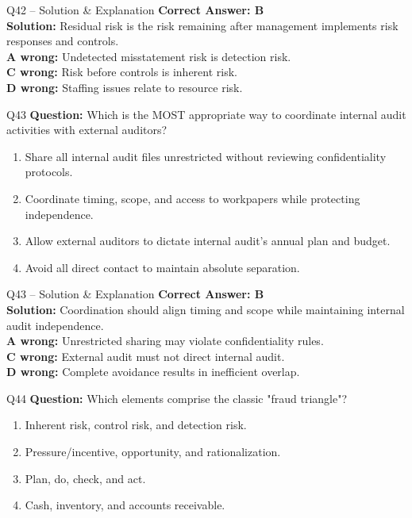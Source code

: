 \documentclass[aspectratio=169,10pt]{beamer}
\begin{document}
	\begin{frame}[t]{Q42 -- Solution \& Explanation}
		\small
		\textbf{Correct Answer: B} \\[4pt]
		\textbf{Solution:} Residual risk is the risk remaining after management implements risk responses and controls. \\[4pt]
		\textbf{A wrong:} Undetected misstatement risk is detection risk. \\[2pt]
		\textbf{C wrong:} Risk before controls is inherent risk. \\[2pt]
		\textbf{D wrong:} Staffing issues relate to resource risk.
	\end{frame}
	
	\begin{frame}[t]{Q43}
		\small
		\textbf{Question:} Which is the MOST appropriate way to coordinate internal audit activities with external auditors?
		\begin{enumerate}[label=\Alph*.,itemsep=1pt,topsep=2pt]
			\item Share all internal audit files unrestricted without reviewing confidentiality protocols.
			\item Coordinate timing, scope, and access to workpapers while protecting independence.
			\item Allow external auditors to dictate internal audit's annual plan and budget.
			\item Avoid all direct contact to maintain absolute separation.
		\end{enumerate}
	\end{frame}
	
	\begin{frame}[t]{Q43 -- Solution \& Explanation}
		\small
		\textbf{Correct Answer: B} \\[4pt]
		\textbf{Solution:} Coordination should align timing and scope while maintaining internal audit independence. \\[4pt]
		\textbf{A wrong:} Unrestricted sharing may violate confidentiality rules. \\[2pt]
		\textbf{C wrong:} External audit must not direct internal audit. \\[2pt]
		\textbf{D wrong:} Complete avoidance results in inefficient overlap.
	\end{frame}
	
	\begin{frame}[t]{Q44}
		\small
		\textbf{Question:} Which elements comprise the classic "fraud triangle"?
		\begin{enumerate}[label=\Alph*.,itemsep=1pt,topsep=2pt]
			\item Inherent risk, control risk, and detection risk.
			\item Pressure/incentive, opportunity, and rationalization.
			\item Plan, do, check, and act.
			\item Cash, inventory, and accounts receivable.
		\end{enumerate}
	\end{frame}
	
\end{document}
